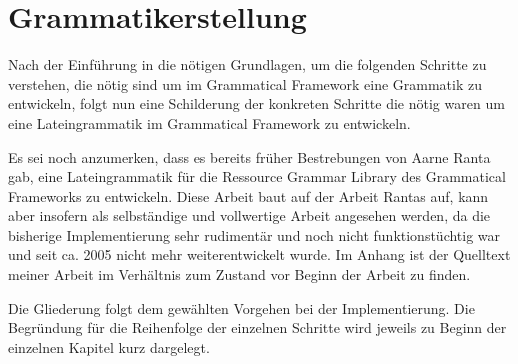 \documentclass[fontsize=12pt,abstract=on,titlepage,bibliography=totoc,ngerman,listof=totoc]{scrreprt}
\begin{document}
\chapter{Grammatikerstellung}
\label{chap:grammatik}
Nach der Einführung in die nötigen Grundlagen, um die folgenden Schritte zu verstehen, die nötig sind um im Grammatical Framework eine Grammatik zu entwickeln, folgt nun eine Schilderung der konkreten Schritte die nötig waren um eine Lateingrammatik im Grammatical Framework zu entwickeln. \par
Es sei noch anzumerken, dass es bereits früher Bestrebungen von Aarne Ranta gab, eine Lateingrammatik für die Ressource Grammar Library des Grammatical Frameworks zu entwickeln. Diese Arbeit baut auf der Arbeit Rantas auf, kann aber insofern als selbständige und vollwertige Arbeit angesehen werden, da die bisherige Implementierung sehr rudimentär und noch nicht funktionstüchtig war und seit ca. 2005 nicht mehr weiterentwickelt wurde. Im Anhang ist der Quelltext meiner Arbeit im Verhältnis zum Zustand vor Beginn der Arbeit zu finden. \par
Die Gliederung folgt dem gewählten Vorgehen bei der Implementierung. Die Begründung für die Reihenfolge der einzelnen Schritte wird jeweils zu Beginn der einzelnen Kapitel kurz dargelegt.
\pagebreak
\end{document}
